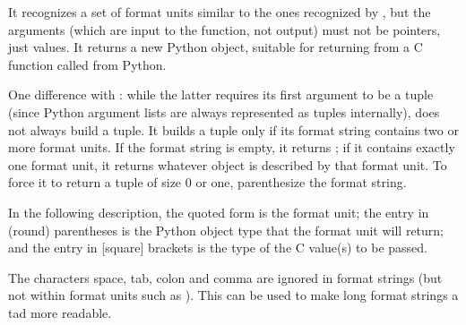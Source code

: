 \documentclass{manual}
\begin{document}
It recognizes a set of format units similar to the ones recognized by
, but the arguments (which are input to the
function, not output) must not be pointers, just values.  It returns a
new Python object, suitable for returning from a C function called
from Python.

One difference with : while the latter
requires its first argument to be a tuple (since Python argument lists
are always represented as tuples internally),
 does not always build a tuple.  It builds
a tuple only if its format string contains two or more format units.
If the format string is empty, it returns ; if it contains
exactly one format unit, it returns whatever object is described by
that format unit.  To force it to return a tuple of size 0 or one,
parenthesize the format string.

In the following description, the quoted form is the format unit; the
entry in (round) parentheses is the Python object type that the format
unit will return; and the entry in [square] brackets is the type of
the C value(s) to be passed.

The characters space, tab, colon and comma are ignored in format
strings (but not within format units such as ).  This can be
used to make long format strings a tad more readable.
\end{document}
